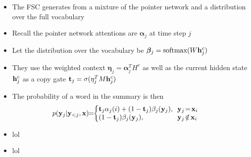 \begin{frame}
\begin{center}
\end{center}    
\begin{itemize}
    \item The FSC generates from a mixture of the pointer network and a distribution over the full vocabulary
    \item Recall the pointer network attentions are $\bm\alpha_j$ at time step $j$
    \item Let the distribution over the vocabulary be $\bm\beta_j = \textrm{softmax}(W\mathbf{h}_j^c)$
    \item They use the weighted context $\bm\eta_j = \bm\alpha_j^T H^e$
        as well as the current hidden state $\mathbf{h}^c_j$ as a copy gate 
        $\mathbf{t}_j = \sigma(\eta_j^TM\mathbf{h}_j^c)$
    \item The probability of a word in the summary is then
    \begin{align}                                                                                                             
  & p ( \by_j | \by_{<j}, \bx )                                                             
\!\!  = \!\! \left\{\!\!\! \begin{array}{ll}                                                                              
     \bt_j \alpha_j(i) + (1-\bt_j)  \beta_j(\by_j), & \!\!  \by_j\!=\!\bx_i\\
     (1-\bt_j)  \beta_j(\by_j), & \!\!  \by_j \!\notin\! \bx_i
   \end{array} \right.                                                               
\end{align}                                                                                                               

\end{itemize}
\end{frame}

\begin{frame}
\begin{center}
\end{center}
\begin{itemize}
\item lol
\end{itemize}
\end{frame}


\begin{frame}
\begin{center}
\end{center}
\begin{itemize}
\item lol
\end{itemize}
\end{frame}

